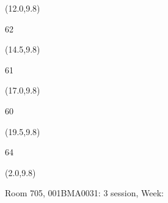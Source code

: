 \documentclass[a4paper]{article}
\newcommand{\myseat}[4]{%
\vspace{-0.1cm} \hspace{-0.5cm}
\parbox[t][2.2cm][t]{3.5cm}{%
\small #1 %
\begin{description}
\vspace{-0.1cm}
\item [ID:] #2
\vspace{-0.1cm}
\item [Team:] #3 \normalsize
\vspace{-0.1cm}
\item \normalsize #4
\vspace{-0.1cm}
\end{description}
}
}
\begin{document}
\begin{textblock}{2.5}(12.0,9.8)
\textblockcolor{}
\myseat{62}{}{}{}
\end{textblock}

\begin{textblock}{2.5}(14.5,9.8)
\textblockcolor{}
\myseat{61}{}{}{}
\end{textblock}

\begin{textblock}{2.5}(17.0,9.8)
\textblockcolor{}
\myseat{60}{}{}{}
\end{textblock}

\begin{textblock}{2.5}(19.5,9.8)
\textblockcolor{}
\myseat{64}{}{}{}
\end{textblock}

\begin{textblock}{10}(2.0,9.8)
\textblockcolor{}
\parbox[t][2.2cm][t]{9.5cm}{%
\large Room 705, 001BMA0031: 3 session, Week: 
\vspace{-0.3cm} \hspace{-0.5cm}
}
\end{textblock}
\end{document}
